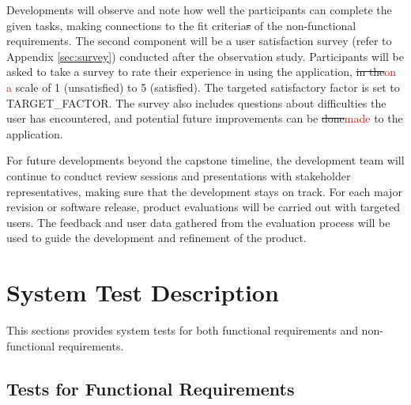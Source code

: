 \documentclass[12pt, titlepage]{article}
\newcommand{\rt}[1]{\textcolor{red}{#1}}
\begin{document}
Developments will observe and note how well the participants can complete the
given tasks, making connections to the fit criteria\sout{s} of the non-functional
requirements. The second component will be a user satisfaction survey (refer to
Appendix \ref{sec:survey}) conducted after the observation study. Participants
will be asked to take a survey to rate their experience in using the
application, \sout{in the}\rt{on a} scale of 1 (unsatisfied) to 5 (satisfied). The targeted
satisfactory factor is set to TARGET\_FACTOR. The survey also includes questions
about difficulties the user has encountered, and potential future improvements
can be \sout{done}\rt{made} to the application.

For future developments beyond the capstone timeline, the development team will
continue to conduct review sessions and presentations with stakeholder
representatives, making sure that the development stays on track. For each major
revision or software release, product evaluations will be carried out with
targeted users. The feedback and user data gathered from the evaluation process
will be used to guide the development and refinement of the product.

\section{System Test Description}

This sections provides system tests for both functional requirements and
non-functional requirements.

\subsection{Tests for Functional Requirements}
\end{document}
